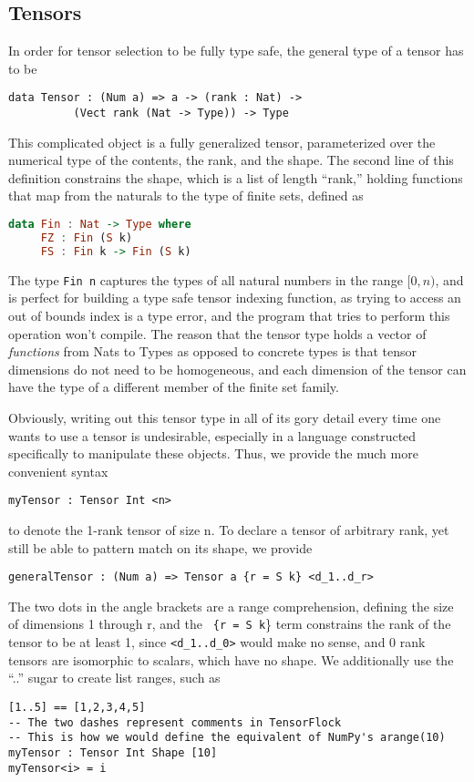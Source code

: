 \documentclass[12pt]{article}
\begin{document}
\subsection{Tensors}
In order for tensor selection to be fully type safe, the general type of a tensor has to be
\begin{lstlisting}
data Tensor : (Num a) => a -> (rank : Nat) -> 
	      (Vect rank (Nat -> Type)) -> Type
\end{lstlisting}
This complicated object is a fully generalized tensor, parameterized over the numerical type of the contents, the rank, and the shape. The second line of this definition constrains the shape, which is a list of length ``rank,'' holding functions that map from the naturals to the type of finite sets, defined as 
\begin{lstlisting}[language=Haskell]
data Fin : Nat -> Type where
     FZ : Fin (S k)
     FS : Fin k -> Fin (S k)
\end{lstlisting}
The type \lstinline{Fin n}
captures the types of all natural numbers in the range $[0,n)$, and is perfect for building a type safe tensor indexing function, as trying to access an out of bounds index is a type error, and the program that tries to perform this operation won't compile. The reason that the tensor type holds a vector of \textit{functions} from Nats to Types as opposed to concrete types is that tensor dimensions do not need to be homogeneous, and each dimension of the tensor can have the type of a different member of the finite set family. 

Obviously, writing out this tensor type in all of its gory detail every time one wants to use a tensor is undesirable, especially in a language constructed specifically to manipulate these objects. Thus, we provide the much more convenient syntax 
\begin{lstlisting}
myTensor : Tensor Int <n>
\end{lstlisting}
to denote the 1-rank tensor of size n. To declare a tensor of arbitrary rank, yet still be able to pattern match on its shape, we provide
\begin{lstlisting}
generalTensor : (Num a) => Tensor a {r = S k} <d_1..d_r>
\end{lstlisting}
\pagebreak
The two dots in the angle brackets are a range comprehension, defining the size of dimensions 1 through r, and the \lstinline{ {r = S k}\} term constrains the rank of the tensor to be at least 1, since 
\lstinline{<d_1..d_0>} would make no sense, and 0 rank tensors are isomorphic to scalars, which have no shape. We additionally use the ``..'' sugar to create list ranges, such as 
\begin{lstlisting}
[1..5] == [1,2,3,4,5]
-- The two dashes represent comments in TensorFlock
-- This is how we would define the equivalent of NumPy's arange(10)
myTensor : Tensor Int Shape [10]
myTensor<i> = i 
\end{lstlisting}
\end{document}
